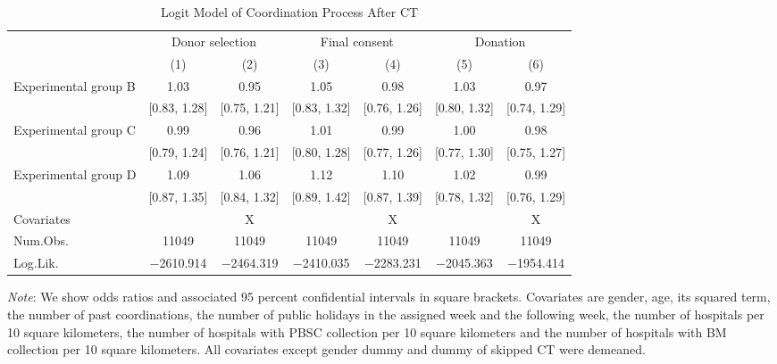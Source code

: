\documentclass[12pt, a4paper]{article}
\begin{document}
\begin{table}[H]

\caption{\label{tab:logit-coordinate}Logit Model of Coordination Process After CT}
\centering
\fontsize{8}{10}\selectfont
\begin{threeparttable}
\begin{tabular}[t]{lcccccc}
\toprule
\multicolumn{1}{c}{ } & \multicolumn{2}{c}{Donor selection} & \multicolumn{2}{c}{Final consent} & \multicolumn{2}{c}{Donation} \\
\cmidrule(l{3pt}r{3pt}){2-3} \cmidrule(l{3pt}r{3pt}){4-5} \cmidrule(l{3pt}r{3pt}){6-7}
  & (1) & (2) & (3) & (4) & (5) & (6)\\
\midrule
Experimental group B & \num{1.03} & \num{0.95} & \num{1.05} & \num{0.98} & \num{1.03} & \num{0.97}\\
 & {}[\num{0.83}, \num{1.28}] & {}[\num{0.75}, \num{1.21}] & {}[\num{0.83}, \num{1.32}] & {}[\num{0.76}, \num{1.26}] & {}[\num{0.80}, \num{1.32}] & {}[\num{0.74}, \num{1.29}]\\
Experimental group C & \num{0.99} & \num{0.96} & \num{1.01} & \num{0.99} & \num{1.00} & \num{0.98}\\
 & {}[\num{0.79}, \num{1.24}] & {}[\num{0.76}, \num{1.21}] & {}[\num{0.80}, \num{1.28}] & {}[\num{0.77}, \num{1.26}] & {}[\num{0.77}, \num{1.30}] & {}[\num{0.75}, \num{1.27}]\\
Experimental group D & \num{1.09} & \num{1.06} & \num{1.12} & \num{1.10} & \num{1.02} & \num{0.99}\\
 & {}[\num{0.87}, \num{1.35}] & {}[\num{0.84}, \num{1.32}] & {}[\num{0.89}, \num{1.42}] & {}[\num{0.87}, \num{1.39}] & {}[\num{0.78}, \num{1.32}] & {}[\num{0.76}, \num{1.29}]\\
\midrule
Covariates &  & X &  & X &  & X\\
Num.Obs. & \num{11049} & \num{11049} & \num{11049} & \num{11049} & \num{11049} & \num{11049}\\
Log.Lik. & \num{-2610.914} & \num{-2464.319} & \num{-2410.035} & \num{-2283.231} & \num{-2045.363} & \num{-1954.414}\\
\bottomrule
\end{tabular}
\begin{tablenotes}
\item \emph{Note}: We show odds ratios and associated 95 percent confidential intervals in square brackets. Covariates are gender, age, its squared term, the number of past coordinations, the number of public holidays in the assigned week and the following week, the number of hospitals per 10 square kilometers, the number of hospitals with PBSC collection per 10 square kilometers and the number of hospitals with BM collection per 10 square kilometers. All covariates except gender dummy and dummy of skipped CT were demeaned.
\end{tablenotes}
\end{threeparttable}
\end{table}
\end{document}
